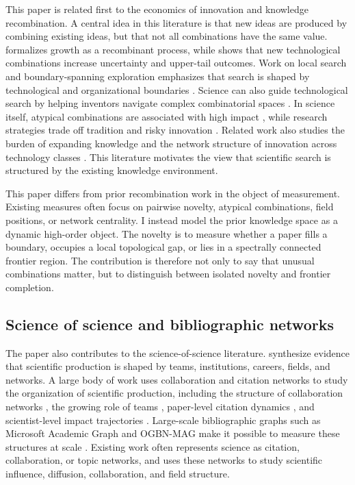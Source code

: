 \documentclass[preprint,12pt,authoryear]{elsarticle}
\begin{document}
This paper is related first to the economics of innovation and knowledge recombination. A central idea in this literature is that new ideas are produced by combining existing ideas, but that not all combinations have the same value. \citet{weitzman1998recombinant} formalizes growth as a recombinant process, while \citet{fleming2001recombinant} shows that new technological combinations increase uncertainty and upper-tail outcomes. Work on local search and boundary-spanning exploration emphasizes that search is shaped by technological and organizational boundaries \citep{rosenkopf2001beyond}. Science can also guide technological search by helping inventors navigate complex combinatorial spaces \citep{fleming2004science}. In science itself, atypical combinations are associated with high impact \citep{uzzi2013atypical}, while research strategies trade off tradition and risky innovation \citep{foster2015tradition}. Related work also studies the burden of expanding knowledge and the network structure of innovation across technology classes \citep{jones2009burden,acemoglu2016innovation}. This literature motivates the view that scientific search is structured by the existing knowledge environment.

This paper differs from prior recombination work in the object of measurement. Existing measures often focus on pairwise novelty, atypical combinations, field positions, or network centrality. I instead model the prior knowledge space as a dynamic high-order object. The novelty is to measure whether a paper fills a boundary, occupies a local topological gap, or lies in a spectrally connected frontier region. The contribution is therefore not only to say that unusual combinations matter, but to distinguish between isolated novelty and frontier completion.

\subsection{Science of science and bibliographic networks}

The paper also contributes to the science-of-science literature. \citet{fortuna2020science} synthesize evidence that scientific production is shaped by teams, institutions, careers, fields, and networks. A large body of work uses collaboration and citation networks to study the organization of scientific production, including the structure of collaboration networks \citep{newman2001structure}, the growing role of teams \citep{wuchty2007increasing}, paper-level citation dynamics \citep{wang2013quantifying}, and scientist-level impact trajectories \citep{sinatra2016quantifying}. Large-scale bibliographic graphs such as Microsoft Academic Graph and OGBN-MAG make it possible to measure these structures at scale \citep{sinha2015overview,hu2020ogb}. Existing work often represents science as citation, collaboration, or topic networks, and uses these networks to study scientific influence, diffusion, collaboration, and field structure.
\end{document}
